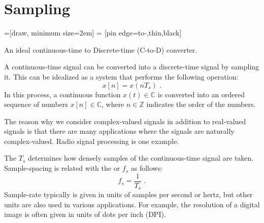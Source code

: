 \section{Sampling}
\begin{marginfigure}
  =[draw, minimum size=2em]
   = [pin edge={to-,thin,black}]
  \begin{center}
  \end{center}
  \caption{An ideal continuous-time to Discrete-time (C-to-D) converter.}
\end{marginfigure}


A continuous-time signal can be converted into a discrete-time signal
by sampling it. This can be idealized as a system that performs the following operation:
\begin{equation}
  \boxed{
    x[n] = x(n T_s)
  }\,\,.
\end{equation}
In this process, a continuous function $x(t) \in \mathbb{C}$ is converted into an ordered 
sequence of numbers $x[n] \in \mathbb{C}$, where $n\in\mathbb{Z}$ indicates the order of the numbers.

The reason why we consider complex-valued signals in addition to real-valued signals is 
that there are many applications where the signals are naturally complex-valued. 
Radio signal processing is one example.

The  $T_s$ determines how densely samples of the 
continuous-time signal are taken. Sample-spacing is related with the  
or  $f_s$ as follows:
\begin{equation}
  \boxed{
    f_s = \frac{1}{T_s}
  }\,\,.
\end{equation}
Sample-rate typically is given in units of samples per second or hertz, but other units are also used in various applications.
For example, the resolution of a digital image is often given in units of dots per inch (DPI).

